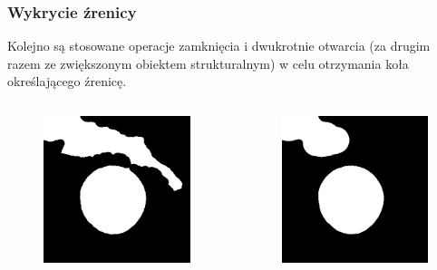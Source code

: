 \documentclass{beamer}
\begin{document}
\begin{frame}
\frametitle{Wykrycie źrenicy}
Kolejno są stosowane operacje zamknięcia i dwukrotnie otwarcia (za drugim razem ze zwiększonym obiektem strukturalnym) w celu otrzymania koła określającego źrenicę.
\begin{columns}
		\begin{figure}
		\begin{center}
		\includegraphics[scale=0.25]{zamkniecie.jpg}
		\end{center}
		\end{figure}
		\begin{figure}
		\begin{center}
		\includegraphics[scale=0.25]{otwarcie1.jpg}

\end{center}
\end{figure}
\end{columns}
\end{frame}
\end{document}
